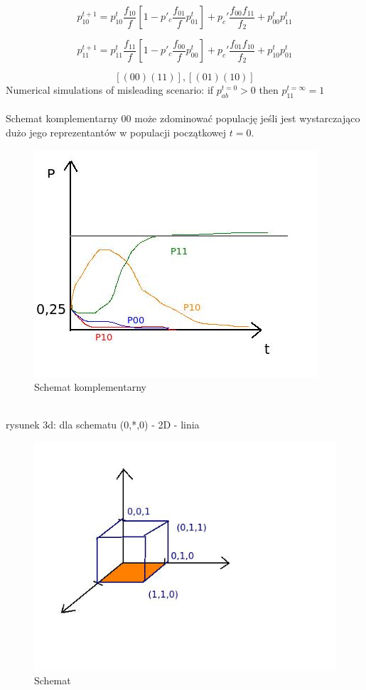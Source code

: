 \documentclass{article}
\begin{document}
			$$p^{t+1}_{10}=p^t_{10}\frac{f_{10}}{f}
			[1-p'_c\frac{f_{01}}{f}p^t_{01}]
			+p_c'\frac{f_{00}f_{11}}{f_2}
			+ p_{00}^tp_{11}^t$$
			
			$$p^{t+1}_{11}=p^t_{11}\frac{f_{11}}{f}
			[1-p'_c\frac{f_{00}}{f}p^t_{00}]
			+p_c'\frac{f_{01}f_{10}}{f_2}
			+ p_{10}^tp_{01}^t$$
			
			$$[(00)(11)], [(01)(10)]$$
			Numerical simulations of misleading scenario:
			if $p_{ab}^{t=0}>0$ then $p_{11}^{t=\infty}=1$ \\
			\paragraph{}
			Schemat komplementarny 00 może zdominować populację jeśli jest wystarczająco dużo jego reprezentantów w populacji początkowej $t=0$.
			\begin{figure}[ht]
				\label{fig:fig1}
				\centering
				\includegraphics[scale=0.4]{wyk5.jpeg}
				\caption{Schemat komplementarny}
			\end{figure}
			\\ rysunek 3d: dla schematu (0,*,0) - 2D - linia \\	
			
						\begin{figure}[ht]
							\label{fig:fig1}
							\centering
							\includegraphics[scale=0.4]{3dwyk5.jpeg}
							\caption{Schemat}
						\end{figure}
						
\end{document}

